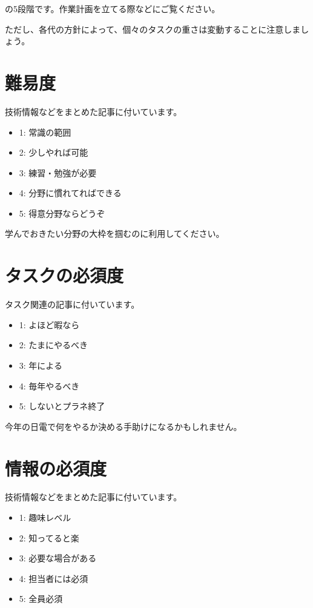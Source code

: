 \documentclass[letterpaper,10pt,dvipdfmx]{sphinxmanual}
\begin{document}
の5段階です。作業計画を立てる際などにご覧ください。

ただし、各代の方針によって、個々のタスクの重さは変動することに注意しましょう。


\section{難易度}
\label{\detokenize{main:}}\label{\detokenize{main:id5}}
技術情報などをまとめた記事に付いています。
\begin{itemize}
\item {} 
1: 常識の範囲

\item {} 
2: 少しやれば可能

\item {} 
3: 練習・勉強が必要

\item {} 
4: 分野に慣れてればできる

\item {} 
5: 得意分野ならどうぞ

\end{itemize}

学んでおきたい分野の大枠を掴むのに利用してください。


\section{タスクの必須度}
\label{\detokenize{main:}}\label{\detokenize{main:id6}}
タスク関連の記事に付いています。
\begin{itemize}
\item {} 
1: よほど暇なら

\item {} 
2: たまにやるべき

\item {} 
3: 年による

\item {} 
4: 毎年やるべき

\item {} 
5: しないとプラネ終了

\end{itemize}

今年の日電で何をやるか決める手助けになるかもしれません。


\section{情報の必須度}
\label{\detokenize{main:}}\label{\detokenize{main:id7}}
技術情報などをまとめた記事に付いています。
\begin{itemize}
\item {} 
1: 趣味レベル

\item {} 
2: 知ってると楽

\item {} 
3: 必要な場合がある

\item {} 
4: 担当者には必須

\item {} 
5: 全員必須

\end{itemize}
\end{document}
